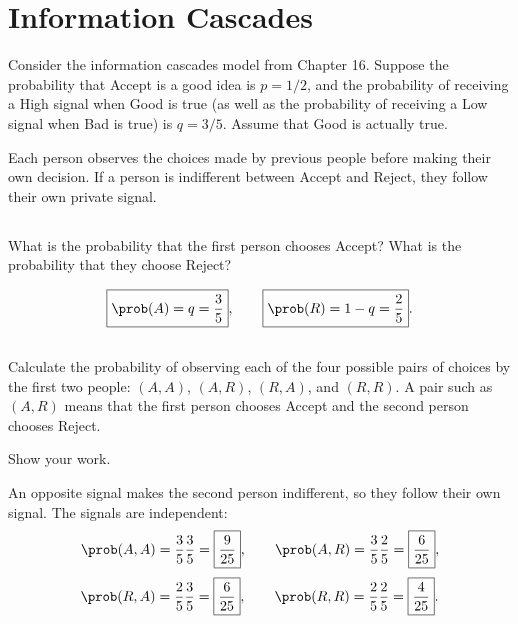 \documentclass[newpages]{assignment}
\begin{document}
\section{Information Cascades}

\begin{problem}
    Consider the information cascades model from Chapter 16. Suppose the probability that Accept is a good idea is $p=1/2$, and the probability of receiving a High signal when Good is true (as well as the probability of receiving a Low signal when Bad is true) is $q=3/5$. Assume that Good is actually true.

    Each person observes the choices made by previous people before making their own decision. If a person is indifferent between Accept and Reject, they follow their own private signal.
\end{problem}

\subsection{}
\begin{problem}
    What is the probability that the first person chooses Accept? What is the probability that they choose Reject?
\end{problem}
\begin{solution}
    \[
        \boxed{\prob(A)=q=\frac{3}{5}},\qquad
        \boxed{\prob(R)=1-q=\frac{2}{5}}.
    \]
\end{solution}

\subsection{}
\begin{problem}
    Calculate the probability of observing each of the four possible pairs of choices by the first two people: $(A,A)$, $(A,R)$, $(R,A)$, and $(R,R)$. A pair such as $(A,R)$ means that the first person chooses Accept and the second person chooses Reject.

    Show your work.
\end{problem}
\begin{solution}
    An opposite signal makes the second person indifferent, so they follow their own signal. The signals are independent:
    \[
        \prob(A,A)=\frac{3}{5}\frac{3}{5}=\boxed{\frac{9}{25}},\qquad
        \prob(A,R)=\frac{3}{5}\frac{2}{5}=\boxed{\frac{6}{25}},
    \]
    \[
        \prob(R,A)=\frac{2}{5}\frac{3}{5}=\boxed{\frac{6}{25}},\qquad
        \prob(R,R)=\frac{2}{5}\frac{2}{5}=\boxed{\frac{4}{25}}.
    \]
\end{solution}
\end{document}
